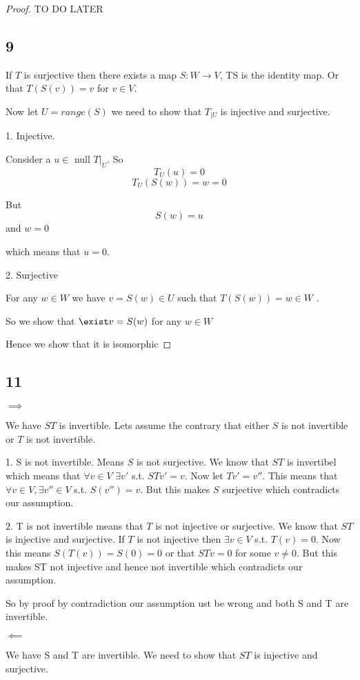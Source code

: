 \documentclass[a4paper]{report}
\begin{document}
\begin{proof}
TO DO LATER 
\subsection*{9}
If $T$ is surjective then there exists a map $S:W \rightarrow V$, TS is the identity map. Or that $T(S(v)) = v$ for  $v \in V$.

Now let  $U = range(S)$ we need to show that  $T_{|U}$ is injective and surjective.

1. Injective.

Consider a $u \in $ null $T|_U$. So $$T_U(u) = 0$$ $$ T_U(S(w)) = w = 0$$

But 
$$ S(w) = u $$  and $w = 0$ 

which means that $u = 0$.

2. Surjective

For any $w \in W$ we have $v = S(w) \in U$ such that $T(S(w)) = w \in W$ .

So we show that  $\exist v = S(w)$ for any $w \in W$ 

Hence we show that it is isomorphic

\end{proof}

\subsection*{11}
$\implies$

We have $ST$ is invertible. Lets assume the contrary that either $S$ is not invertible or $T$ is not invertible.

1. S is not invertible. Means $S$ is not surjective. We know that  $ST$ is invertibel which means that $\forall v \in V$ $\exists v'$ s.t. $STv' = v$. Now let  $Tv' = v''$. This means that $\forall v \in V, \exists v'' \in V $  s.t. $S(v'') = v$. But this makes $S$ surjective which contradicts our assumption.

2. T is not invertible means that $T$ is not injective or surjective. We know that $ST$ is injective and surjective. If $T$ is not injective then $\exists v\in V$ s.t. $T(v) = 0$. Now this means  $S(T(v)) = S(0) = 0$ or that  $STv = 0$ for some $v \ne 0$. But this makes ST not injective and hence not invertible which contradicts our assumption.  

So by proof by contradiction our assumption ust be wrong and both S and T are invertible.


$\impliedby$

We have S and T are invertible. We need to show that $ST$ is injective and surjective.
\end{document}
